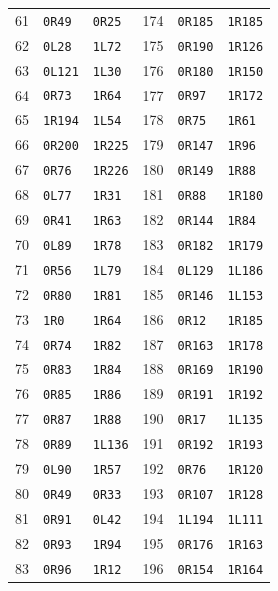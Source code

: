 \begin{longtable}{@{}rll@{\qquad\qquad}rll@{}}
61 & \texttt{0R49} & \texttt{0R25} & 174 & \texttt{0R185} & \texttt{1R185}\\
62 & \texttt{0L28} & \texttt{1L72} & 175 & \texttt{0R190} & \texttt{1R126}\\
63 & \texttt{0L121} & \texttt{1L30} & 176 & \texttt{0R180} & \texttt{1R150}\\
64 & \texttt{0R73} & \texttt{1R64} & 177 & \texttt{0R97} & \texttt{1R172}\\
65 & \texttt{1R194} & \texttt{1L54} & 178 & \texttt{0R75} & \texttt{1R61}\\
66 & \texttt{0R200} & \texttt{1R225} & 179 & \texttt{0R147} & \texttt{1R96}\\
67 & \texttt{0R76} & \texttt{1R226} & 180 & \texttt{0R149} & \texttt{1R88}\\
68 & \texttt{0L77} & \texttt{1R31} & 181 & \texttt{0R88} & \texttt{1R180}\\
69 & \texttt{0R41} & \texttt{1R63} & 182 & \texttt{0R144} & \texttt{1R84}\\
70 & \texttt{0L89} & \texttt{1R78} & 183 & \texttt{0R182} & \texttt{1R179}\\
71 & \texttt{0R56} & \texttt{1L79} & 184 & \texttt{0L129} & \texttt{1L186}\\
72 & \texttt{0R80} & \texttt{1R81} & 185 & \texttt{0R146} & \texttt{1L153}\\
73 & \texttt{1R0} & \texttt{1R64} & 186 & \texttt{0R12} & \texttt{1R185}\\
74 & \texttt{0R74} & \texttt{1R82} & 187 & \texttt{0R163} & \texttt{1R178}\\
75 & \texttt{0R83} & \texttt{1R84} & 188 & \texttt{0R169} & \texttt{1R190}\\
76 & \texttt{0R85} & \texttt{1R86} & 189 & \texttt{0R191} & \texttt{1R192}\\
77 & \texttt{0R87} & \texttt{1R88} & 190 & \texttt{0R17} & \texttt{1L135}\\
78 & \texttt{0R89} & \texttt{1L136} & 191 & \texttt{0R192} & \texttt{1R193}\\
79 & \texttt{0L90} & \texttt{1R57} & 192 & \texttt{0R76} & \texttt{1R120}\\
80 & \texttt{0R49} & \texttt{0R33} & 193 & \texttt{0R107} & \texttt{1R128}\\
81 & \texttt{0R91} & \texttt{0L42} & 194 & \texttt{1L194} & \texttt{1L111}\\
82 & \texttt{0R93} & \texttt{1R94} & 195 & \texttt{0R176} & \texttt{1R163}\\
83 & \texttt{0R96} & \texttt{1R12} & 196 & \texttt{0R154} & \texttt{1R164}\\

\end{longtable}
